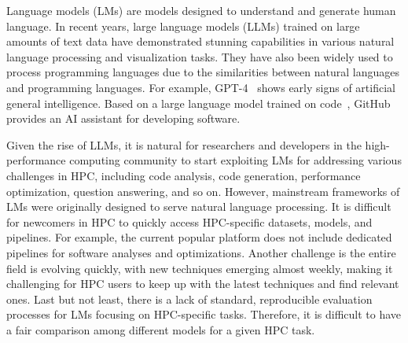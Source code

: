 
Language models (LMs) are models designed to understand and generate human language. In recent years, large language models (LLMs) %
trained on large amounts of text data have demonstrated stunning capabilities in various natural language processing and visualization tasks. They have also been widely used to process programming languages due to the similarities between natural languages and programming languages.  For example, GPT-4~\cite{bubeck2023sparks} shows early signs of artificial general intelligence. Based on a large language model trained on code~\cite{chen2021evaluating}, GitHub provides an AI assistant for developing software. 

Given the rise of LLMs, it is natural for researchers and developers in the high-performance computing community to start exploiting LMs for addressing various challenges in HPC, including code analysis, code generation, performance optimization, question answering, and so on. However, mainstream frameworks of LMs were originally designed to serve natural language processing. It is difficult for newcomers in HPC to quickly access HPC-specific datasets, models, and pipelines. For example, the current popular \face platform does not include dedicated pipelines for software analyses and optimizations. Another challenge is the entire field is evolving quickly, with new techniques emerging almost weekly, making it challenging for HPC users to keep up with the latest techniques and find relevant ones. Last but not least, there is a lack of standard, reproducible evaluation processes for LMs focusing on HPC-specific tasks. Therefore, it is difficult to have a fair comparison among different models for a given HPC task. 


